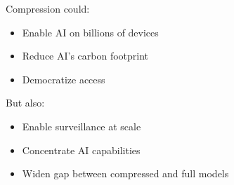 Compression could:

\begin{itemize}
\item Enable AI on billions of devices
\item Reduce AI's carbon footprint
\item Democratize access

\end{itemize}
But also:

\begin{itemize}
\item Enable surveillance at scale
\item Concentrate AI capabilities
\item Widen gap between compressed and full models
\end{itemize}